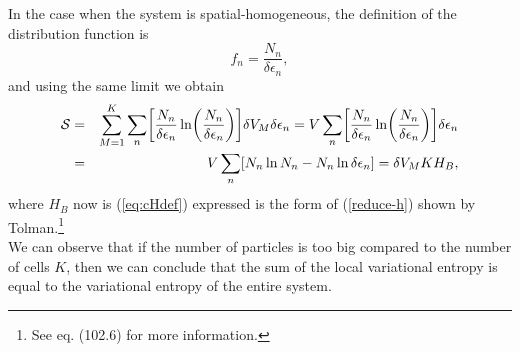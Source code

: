 In the case when the system is spatial-homogeneous, the definition of the distribution function is 
\begin{equation}
    f_{n}=\frac{N_{n}}{ \delta \epsilon_{n} },
\end{equation}
and using the same limit we obtain
\begin{eqnarray}
    \Ss&=& \sum_{M=1}^{K} \sum_n
    \left[  
           \frac{N_{n}}{ \delta \epsilon_{n}} \ln 
           \left( 
                  \frac{N_{n}}{ \delta \epsilon_{n}}
           \right)
    \right]  \delta V_M \delta \epsilon_{n} = V \sum_n
    \left[  
           \frac{N_{n}}{ \delta \epsilon_{n}} \ln 
           \left( 
                  \frac{N_{n}}{ \delta \epsilon_{n}}
           \right)
    \right] \delta \epsilon_{n} \nonumber \\
    &=& V \sum_n \left[N_n \ln N_n - N_n \ln \delta \epsilon_n  \right]=\delta V_M K H_{B},\label{h-quantic4}
\end{eqnarray}
where $H_{B}$ now is (\ref{eq:cHdef}) expressed is the form of (\ref{reduce-h}) shown by Tolman.\footnote{See \cite{bib:tolman} eq. (102.6) for more information.}\\
We can observe that if the number of particles is too big compared to the number of cells $K$, then we can conclude that the sum of the local variational entropy is equal to the variational entropy of the entire system.

